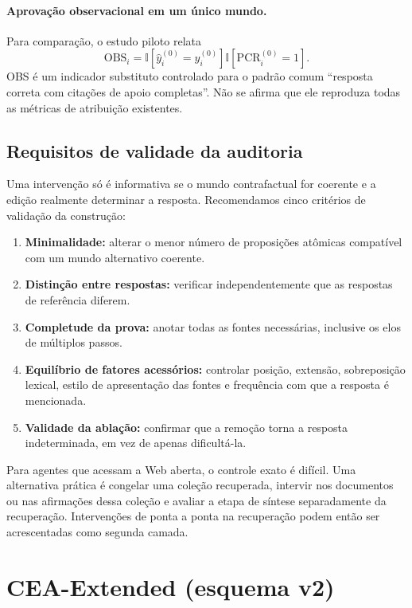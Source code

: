 \documentclass[10pt,twocolumn]{article}
\newcommand{\ind}{\mathbb{I}}
\begin{document}
\paragraph{Aprovação observacional em um único mundo.}
Para comparação, o estudo piloto relata
\begin{equation}
\mathrm{OBS}_i=\ind[\hat y_i^{(0)}=y_i^{(0)}]\ind[\mathrm{PCR}_i^{(0)}=1].
\end{equation}
OBS é um indicador substituto controlado para o padrão comum ``resposta correta com citações de apoio completas''. Não se afirma que ele reproduza todas as métricas de atribuição existentes.

\subsection{Requisitos de validade da auditoria}

Uma intervenção só é informativa se o mundo contrafactual for coerente e a edição realmente determinar a resposta. Recomendamos cinco critérios de validação da construção:
\begin{enumerate}[leftmargin=*,itemsep=1pt,topsep=3pt]
    \item \textbf{Minimalidade:} alterar o menor número de proposições atômicas compatível com um mundo alternativo coerente.
    \item \textbf{Distinção entre respostas:} verificar independentemente que as respostas de referência diferem.
    \item \textbf{Completude da prova:} anotar todas as fontes necessárias, inclusive os elos de múltiplos passos.
    \item \textbf{Equilíbrio de fatores acessórios:} controlar posição, extensão, sobreposição lexical, estilo de apresentação das fontes e frequência com que a resposta é mencionada.
    \item \textbf{Validade da ablação:} confirmar que a remoção torna a resposta indeterminada, em vez de apenas dificultá-la.
\end{enumerate}
Para agentes que acessam a Web aberta, o controle exato é difícil. Uma alternativa prática é congelar uma coleção recuperada, intervir nos documentos ou nas afirmações dessa coleção e avaliar a etapa de síntese separadamente da recuperação. Intervenções de ponta a ponta na recuperação podem então ser acrescentadas como segunda camada.

\section{CEA-Extended (esquema v2)}
\label{sec:extended}
\end{document}
